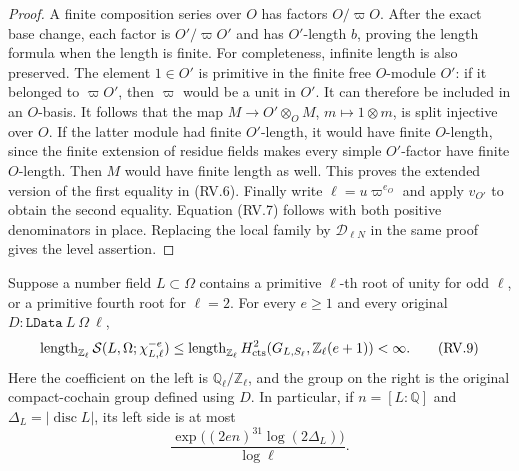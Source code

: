 \begin{proof}
A finite composition series over $O$ has factors $O/\varpi O$.
After the exact base change, each factor is
$O'/\varpi O'$ and has $O'$-length $b$, proving the length formula
when the length is finite.
For completeness, infinite length is also preserved.  The element
$1\in O'$ is primitive in the finite free $O$-module $O'$:
if it belonged to $\varpi O'$, then $\varpi$ would be a unit in $O'$.
It can therefore be included in an $O$-basis.  It follows that
the map $M\to O'\otimes_O M$, $m\mapsto1\otimes m$, is split
injective over $O$.  If the latter module had finite $O'$-length,
it would have finite $O$-length, since the finite extension of
residue fields makes every simple $O'$-factor have finite $O$-length.
Then $M$ would have finite length as well.  This proves the extended
version of the first equality in (RV.6).
Finally write $\ell=u\varpi^{e_O}$ and apply $v_{O'}$ to obtain
the second equality.  Equation (RV.7) follows with both positive
denominators in place.  Replacing the local family by
$\mathscr D_{\ell N}$ in the same proof gives the level assertion.
\end{proof}

\begin{proposition}
\label{claim:RV2}
Suppose a number field $L\subset\Omega$ contains a primitive
$\ell$-th root of unity for odd $\ell$, or a primitive fourth
root for $\ell=2$.  For every $e\ge1$ and every original
$D:\texttt{LData}\ L\ \Omega\ \ell$,
\[
 \operatorname{length}_{\mathbb Z_\ell}
 \mathcal S(L,\Omega;\chi_{L,\ell}^{-e})
 \le
 \operatorname{length}_{\mathbb Z_\ell}
 H^2_{\rm cts}(G_{L,S_\ell},\mathbb Z_\ell(e+1))
 <\infty .
 \tag{RV.9}
\]
Here the coefficient on the left is $\mathbb Q_\ell/\mathbb Z_\ell$,
and the group on the right is the original compact-cochain group
defined using $D$.
In particular, if $n=[L:\mathbb Q]$ and
$\Delta_L=|\operatorname{disc}L|$, its left side is at most
\[
       \frac{\exp\!\big((2en)^{31}\log(2\Delta_L)\big)}
                       {\log\ell}.
 \tag{RV.10}
\]
\end{proposition}

